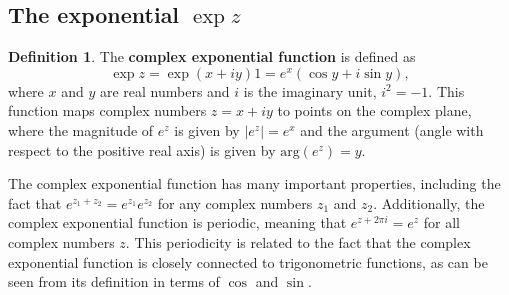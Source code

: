 \documentclass[12pt,openany]{book}
\theoremstyle{definition}
\newtheorem{definition}{Definition}
\begin{document}
	\subsection{The exponential $\exp z$}
	\begin{tcolorbox}
		\begin{definition}
			The \textbf{complex exponential function} is defined as
			\begin{equation*}
			\exp{z} =\exp{(x+iy)}1 = e^{x}(\cos y + i\sin y),
			\end{equation*}
			where $x$ and $y$ are real numbers and $i$ is the imaginary unit, $i^2=-1$. This function maps complex numbers $z=x+iy$ to points on the complex plane, where the magnitude of $e^{z}$ is given by $|e^{z}|=e^{x}$ and the argument (angle with respect to the positive real axis) is given by $\text{arg}(e^{z})=y$.
			
			The complex exponential function has many important properties, including the fact that $e^{z_{1}+z_{2}}=e^{z_{1}}e^{z_{2}}$ for any complex numbers $z_{1}$ and $z_{2}$. Additionally, the complex exponential function is periodic, meaning that $e^{z+2\pi i}=e^{z}$ for all complex numbers $z$. This periodicity is related to the fact that the complex exponential function is closely connected to trigonometric functions, as can be seen from its definition in terms of $\cos$ and $\sin$.
		\end{definition}
	\end{tcolorbox}
	
	
\end{document}
